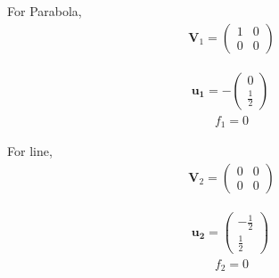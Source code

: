 \documentclass[10pt,a4paper]{report}
\newcommand{\myvec}[1]{\ensuremath{\begin{pmatrix}#1\end{pmatrix}}}
\let\vec\mathbf
\let\vec\mathbf
\begin{document}
\begin{multicols}{2}
For Parabola,\\\vspace{1mm}
\begin{align}
\vec{V}_1=\myvec{
1 & 0\\
0 & 0
}
\end{align} 

\begin{align}
\vec{u_1}= -\myvec{
0\\
\frac{1}{2}
}\
\end{align} 
\begin{align}
f_1=0
\end{align} \vspace{2mm}

For line,\\\vspace{1mm}
\begin{align}
\vec{V}_2=\myvec{
0 & 0\\
0 & 0
}
\end{align} 


\begin{align}
\vec{u_2}= \myvec{
-\frac{1}{2}\\
\frac{1}{2}
}\
\end{align} 
\begin{align}
f_2=0
\end{align} \vspace{2mm}



\end{multicols}
\end{document}
